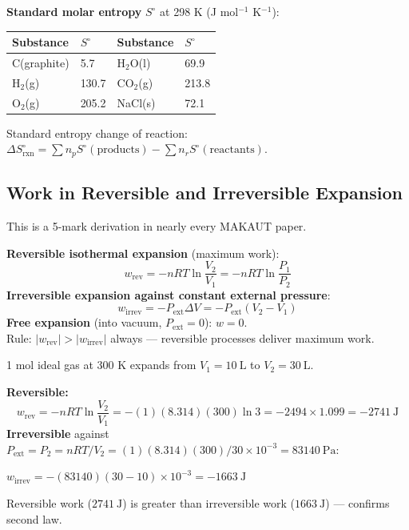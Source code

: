 \documentclass[12pt,a4paper]{article}
\begin{document}
\textbf{Standard molar entropy} $S^\circ$ at 298 K (J mol$^{-1}$ K$^{-1}$):
\begin{tabularx}{\linewidth}{|B{2.6cm}|Y|B{2.6cm}|Y|}
\hline
\textbf{Substance} & \textbf{$S^\circ$} & \textbf{Substance} & \textbf{$S^\circ$} \\
\hline
C(graphite) & 5.7 & H$_2$O(l) & 69.9 \\
\hline
H$_2$(g) & 130.7 & CO$_2$(g) & 213.8 \\
\hline
O$_2$(g) & 205.2 & NaCl(s) & 72.1 \\
\hline
\end{tabularx}

Standard entropy change of reaction: $\Delta S^\circ_{\mathrm{rxn}} = \sum n_p S^\circ(\text{products}) - \sum n_r S^\circ(\text{reactants})$.

\subsection{Work in Reversible and Irreversible Expansion}
This is a 5-mark derivation in nearly every MAKAUT paper.

\begin{tcolorbox}[formulabox, title={Work Done by an Ideal Gas}]
\textbf{Reversible isothermal expansion} (maximum work):
\[
w_{\mathrm{rev}} = -nRT\ln\frac{V_2}{V_1} = -nRT\ln\frac{P_1}{P_2}
\]
\textbf{Irreversible expansion against constant external pressure}:
\[
w_{\mathrm{irrev}} = -P_{\mathrm{ext}}\Delta V = -P_{\mathrm{ext}}(V_2-V_1)
\]
\textbf{Free expansion} (into vacuum, $P_{\mathrm{ext}}=0$): $w = 0$.\\
Rule: $|w_{\mathrm{rev}}| > |w_{\mathrm{irrev}}|$ always — reversible processes deliver maximum work.
\end{tcolorbox}

\begin{tcolorbox}[examplebox, title={Solved Example: Reversible vs Irreversible Work}]
1 mol ideal gas at 300 K expands from $V_1=10\ \mathrm{L}$ to $V_2=30\ \mathrm{L}$.

\textbf{Reversible:}
\[
w_{\mathrm{rev}} = -nRT\ln\frac{V_2}{V_1} = -(1)(8.314)(300)\ln 3 = -2494\times1.099 = -2741\ \mathrm{J}
\]
\textbf{Irreversible} against $P_{\mathrm{ext}} = P_2 = nRT/V_2 = (1)(8.314)(300)/30\times10^{-3} = 83140\ \mathrm{Pa}$:

$w_{\mathrm{irrev}} = -(83140)(30-10)\times10^{-3} = -1663\ \mathrm{J}$

Reversible work ($2741\ \mathrm{J}$) is greater than irreversible work ($1663\ \mathrm{J}$) — confirms second law.
\end{tcolorbox}
\end{document}
